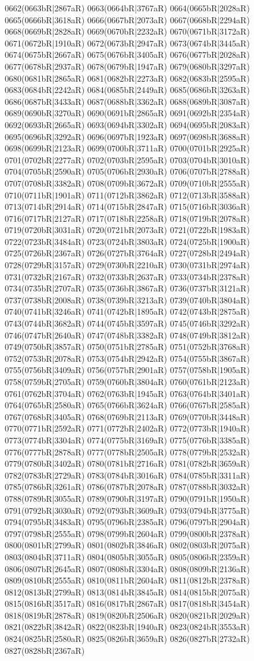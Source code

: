 0662(0663bR|2867aR) 0663(0664bR|3767aR) 0664(0665bR|2028aR) 0665(0666bR|3618aR) 0666(0667bR|2073aR) 0667(0668bR|2294aR) 0668(0669bR|2828aR) 0669(0670bR|2232aR) 0670(0671bR|3172aR) 0671(0672bR|1910aR) 0672(0673bR|2947aR) 0673(0674bR|3445aR) 0674(0675bR|2667aR) 0675(0676bR|3405aR) 0676(0677bR|2028aR) 0677(0678bR|2937aR) 0678(0679bR|1947aR) 0679(0680bR|3297aR) 0680(0681bR|2865aR) 0681(0682bR|2273aR) 0682(0683bR|2595aR) 0683(0684bR|2242aR) 0684(0685bR|2449aR) 0685(0686bR|3263aR) 0686(0687bR|3433aR) 0687(0688bR|3362aR) 0688(0689bR|3087aR) 0689(0690bR|3270aR) 0690(0691bR|2865aR) 0691(0692bR|2354aR) 0692(0693bR|2665aR) 0693(0694bR|3302aR) 0694(0695bR|2083aR) 0695(0696bR|3292aR) 0696(0697bR|1923aR) 0697(0698bR|3688aR) 0698(0699bR|2123aR) 0699(0700bR|3711aR) 0700(0701bR|2925aR) 0701(0702bR|2277aR) 0702(0703bR|2595aR) 0703(0704bR|3010aR) 0704(0705bR|2590aR) 0705(0706bR|2930aR) 0706(0707bR|2788aR) 0707(0708bR|3382aR) 0708(0709bR|3672aR) 0709(0710bR|2555aR) 0710(0711bR|1901aR) 0711(0712bR|3862aR) 0712(0713bR|3588aR) 0713(0714bR|2914aR) 0714(0715bR|2847aR) 0715(0716bR|3036aR) 0716(0717bR|2127aR) 0717(0718bR|2258aR) 0718(0719bR|2078aR) 0719(0720bR|3031aR) 0720(0721bR|2073aR) 0721(0722bR|1983aR) 0722(0723bR|3484aR) 0723(0724bR|3803aR) 0724(0725bR|1900aR) 0725(0726bR|2367aR) 0726(0727bR|3764aR) 0727(0728bR|2494aR) 0728(0729bR|3157aR) 0729(0730bR|2210aR) 0730(0731bR|2974aR) 0731(0732bR|2167aR) 0732(0733bR|2637aR) 0733(0734bR|2378aR) 0734(0735bR|2707aR) 0735(0736bR|3867aR) 0736(0737bR|3121aR) 0737(0738bR|2008aR) 0738(0739bR|3213aR) 0739(0740bR|3804aR) 0740(0741bR|3246aR) 0741(0742bR|1895aR) 0742(0743bR|2875aR) 0743(0744bR|3682aR) 0744(0745bR|3597aR) 0745(0746bR|3292aR) 0746(0747bR|2640aR) 0747(0748bR|3382aR) 0748(0749bR|3812aR) 0749(0750bR|3857aR) 0750(0751bR|2785aR) 0751(0752bR|3768aR) 0752(0753bR|2078aR) 0753(0754bR|2942aR) 0754(0755bR|3867aR) 0755(0756bR|3409aR) 0756(0757bR|2901aR) 0757(0758bR|1905aR) 0758(0759bR|2705aR) 0759(0760bR|3804aR) 0760(0761bR|2123aR) 0761(0762bR|3704aR) 0762(0763bR|1945aR) 0763(0764bR|3401aR) 0764(0765bR|2580aR) 0765(0766bR|3624aR) 0766(0767bR|2585aR) 0767(0768bR|3405aR) 0768(0769bR|2113aR) 0769(0770bR|3448aR) 0770(0771bR|2592aR) 0771(0772bR|2402aR) 0772(0773bR|1940aR) 0773(0774bR|3304aR) 0774(0775bR|3169aR) 0775(0776bR|3385aR) 0776(0777bR|2878aR) 0777(0778bR|2505aR) 0778(0779bR|2532aR) 0779(0780bR|3402aR) 0780(0781bR|2716aR) 0781(0782bR|3659aR) 0782(0783bR|2729aR) 0783(0784bR|3016aR) 0784(0785bR|3311aR) 0785(0786bR|3261aR) 0786(0787bR|2078aR) 0787(0788bR|3032aR) 0788(0789bR|3055aR) 0789(0790bR|3197aR) 0790(0791bR|1950aR) 0791(0792bR|3030aR) 0792(0793bR|3609aR) 0793(0794bR|3775aR) 0794(0795bR|3483aR) 0795(0796bR|2385aR) 0796(0797bR|2904aR) 0797(0798bR|2555aR) 0798(0799bR|2604aR) 0799(0800bR|2378aR) 0800(0801bR|2799aR) 0801(0802bR|3846aR) 0802(0803bR|2075aR) 0803(0804bR|3711aR) 0804(0805bR|3055aR) 0805(0806bR|2359aR) 0806(0807bR|2645aR) 0807(0808bR|3304aR) 0808(0809bR|2136aR) 0809(0810bR|2555aR) 0810(0811bR|2604aR) 0811(0812bR|2378aR) 0812(0813bR|2799aR) 0813(0814bR|3845aR) 0814(0815bR|2075aR) 0815(0816bR|3517aR) 0816(0817bR|2867aR) 0817(0818bR|3454aR) 0818(0819bR|2878aR) 0819(0820bR|2506aR) 0820(0821bR|2029aR) 0821(0822bR|3842aR) 0822(0823bR|1940aR) 0823(0824bR|3553aR) 0824(0825bR|2580aR) 0825(0826bR|3659aR) 0826(0827bR|2732aR) 0827(0828bR|2367aR) 